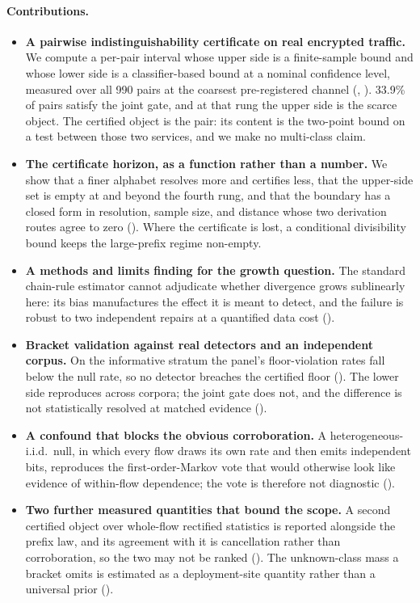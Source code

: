 \paragraph{Contributions.}
\begin{itemize}
  \item \textbf{A pairwise indistinguishability certificate on real encrypted
  traffic.} We compute a per-pair interval whose upper side is a finite-sample
  bound and whose lower side is a classifier-based bound at a nominal confidence
  level, measured over all 990 pairs at the coarsest pre-registered channel
  (, ). 33.9\% of pairs satisfy the
  joint gate, and at that rung the upper side is the scarce object. The
  certified object is the pair: its content is the two-point bound on a test
  between those two services, and we make no multi-class claim.
  \item \textbf{The certificate horizon, as a function rather than a number.}
  We show that a finer alphabet resolves more and certifies less, that the
  upper-side set is empty at and beyond the fourth rung, and that the boundary has a
  closed form in resolution, sample size, and distance whose two derivation
  routes agree to zero (). Where the certificate is
  lost, a conditional divisibility bound keeps the large-prefix regime
  non-empty.
  \item \textbf{A methods and limits finding for the growth question.} The
  standard chain-rule estimator cannot adjudicate whether divergence grows
  sublinearly here: its bias manufactures the effect it is meant to detect, and
  the failure is robust to two independent repairs at a quantified data cost
  ().
  \item \textbf{Bracket validation against real detectors and an independent
  corpus.} On the informative stratum the panel's floor-violation rates fall
  below the null rate, so no detector breaches the certified floor
  (). The lower side reproduces across
  corpora; the joint gate does not, and the difference is not statistically
  resolved at matched evidence ().
  \item \textbf{A confound that blocks the obvious corroboration.} A
  heterogeneous-i.i.d.\ null, in which every flow draws its own rate and then
  emits independent bits, reproduces the first-order-Markov vote that would
  otherwise look like evidence of within-flow dependence; the vote is therefore
  not diagnostic ().
  \item \textbf{Two further measured quantities that bound the scope.} A second
  certified object over whole-flow rectified statistics is reported alongside the
  prefix law, and its agreement with it is cancellation rather than
  corroboration, so the two may not be ranked ().
  The unknown-class mass a bracket omits is estimated as a deployment-site
  quantity rather than a universal prior ().
\end{itemize}

